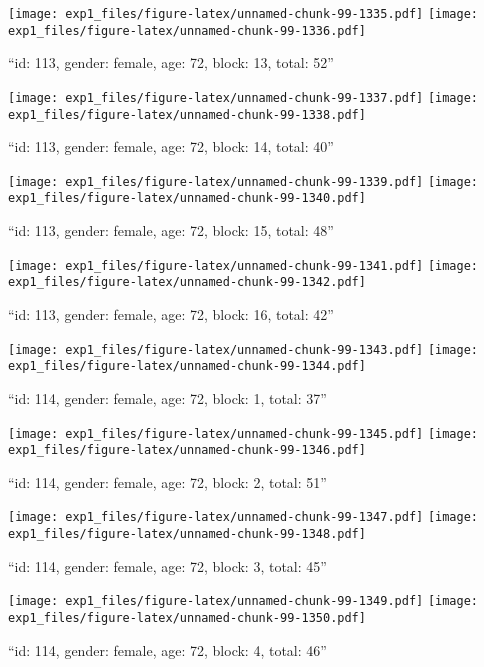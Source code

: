 \documentclass[,]{article}
\begin{document}
\texttt{[image: exp1\_files/figure-latex/unnamed-chunk-99-1335.pdf]}
\texttt{[image: exp1\_files/figure-latex/unnamed-chunk-99-1336.pdf]}

\newpage
[1] 

``id: 113, gender: female, age: 72, block: 13, total: 52''

\texttt{[image: exp1\_files/figure-latex/unnamed-chunk-99-1337.pdf]}
\texttt{[image: exp1\_files/figure-latex/unnamed-chunk-99-1338.pdf]}

\newpage
[1] 

``id: 113, gender: female, age: 72, block: 14, total: 40''

\texttt{[image: exp1\_files/figure-latex/unnamed-chunk-99-1339.pdf]}
\texttt{[image: exp1\_files/figure-latex/unnamed-chunk-99-1340.pdf]}

\newpage
[1] 

``id: 113, gender: female, age: 72, block: 15, total: 48''

\texttt{[image: exp1\_files/figure-latex/unnamed-chunk-99-1341.pdf]}
\texttt{[image: exp1\_files/figure-latex/unnamed-chunk-99-1342.pdf]}

\newpage
[1] 

``id: 113, gender: female, age: 72, block: 16, total: 42''

\texttt{[image: exp1\_files/figure-latex/unnamed-chunk-99-1343.pdf]}
\texttt{[image: exp1\_files/figure-latex/unnamed-chunk-99-1344.pdf]}

\newpage
[1] 

``id: 114, gender: female, age: 72, block: 1, total: 37''

\texttt{[image: exp1\_files/figure-latex/unnamed-chunk-99-1345.pdf]}
\texttt{[image: exp1\_files/figure-latex/unnamed-chunk-99-1346.pdf]}

\newpage
[1] 

``id: 114, gender: female, age: 72, block: 2, total: 51''

\texttt{[image: exp1\_files/figure-latex/unnamed-chunk-99-1347.pdf]}
\texttt{[image: exp1\_files/figure-latex/unnamed-chunk-99-1348.pdf]}

\newpage
[1] 

``id: 114, gender: female, age: 72, block: 3, total: 45''

\texttt{[image: exp1\_files/figure-latex/unnamed-chunk-99-1349.pdf]}
\texttt{[image: exp1\_files/figure-latex/unnamed-chunk-99-1350.pdf]}

\newpage
[1] 

``id: 114, gender: female, age: 72, block: 4, total: 46''
\end{document}
